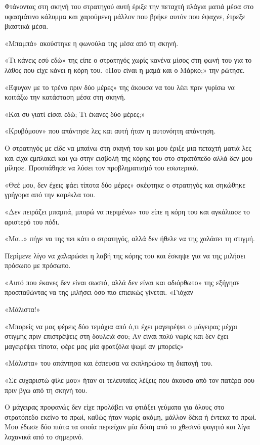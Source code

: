 \documentclass[12pt,twoside, openany]{book}
\begin{document}
Φτάνοντας στη σκηνή του στρατηγού αυτή έριξε την πεταχτή πλάγια ματιά μέσα στο υφασμάτινο κάλυμμα και χαρούμενη μάλλον που βρήκε αυτόν που έψαχνε, έτρεξε βιαστικά μέσα.

«Μπαμπά» ακούστηκε η φωνούλα της μέσα από τη σκηνή.

«Τι κάνεις εσύ εδώ» της είπε ο στρατηγός χωρίς κανένα μίσος στη φωνή του για το λάθος που είχε κάνει η κόρη του. «Που είναι η μαμά και ο Μάρκο;» την ρώτησε.

«Έφυγαν με το τρένο πριν δύο μέρες» της άκουσα να του λέει πριν γυρίσω να κοιτάξω την κατάσταση μέσα στη σκηνή.

«Και συ γιατί είσαι εδώ; Τι έκανες δύο μέρες;»

«Κρυβόμουν» που απάντησε λες και αυτή ήταν η αυτονόητη απάντηση.

Ο στρατηγός με είδε να μπαίνω στη σκηνή του και μου έριξε μια πεταχτή ματιά λες και είχα εμπλακεί και γω στην εισβολή της κόρης του στο στρατόπεδο αλλά δεν μου μίλησε. Προσπάθησε να λύσει τον προβληματισμό του εσωτερικά.

«Θεέ μου, δεν έχεις φάει τίποτα δύο μέρες» σκέφτηκε ο στρατηγός και σηκώθηκε γρήγορα από την καρέκλα του.

«Δεν πειράζει μπαμπά, μπορώ να περιμένω» του είπε η κόρη του και αγκάλιασε το αριστερό του πόδι.

«Μα…» πήγε να της πει κάτι ο στρατηγός, αλλά δεν ήθελε να της χαλάσει τη στιγμή.

Περίμενε λίγο να χαλαρώσει η λαβή της κόρης του και έσκηψε για να της μιλήσει πρόσωπο με πρόσωπο.

«Αυτό που έκανες δεν είναι σωστό, αλλά δεν είναι και αδιόρθωτο» της εξήγησε προσπαθώντας να της μιλήσει όσο πιο επιεικώς γίνεται. «Γιόχαν

«Μάλιστα!»

«Μπορείς να μας φέρεις δύο τεμάχια από ό,τι έχει μαγειρέψει ο μάγειρας μέχρι στιγμής πριν επιστρέψεις στη δουλειά σου; Αν είναι πολύ νωρίς και δεν έχει μαγειρέψει τίποτα, φέρε μας μία φρατζόλα ψωμί αν μπορείς»

«Μάλιστα» του απάντησα και έσπευσα να εκπληρώσω τη διαταγή του.

«Σε ευχαριστώ φίλε μου» ήταν οι τελευταίες λέξεις που άκουσα από τον πατέρα σου πριν βγω από τη σκηνή του.

Ο μάγειρας προφανώς δεν είχε προλάβει να φτιάξει γεύματα για όλους στο στρατόπεδο εκείνο το πρωί, καθώς ήταν νωρίς ακόμη, μάλλον δέκα ή έντεκα το πρωί. Μου έδωσε δύο πιάτα τα οποία περιείχαν μία δόση από το χθεσινό φαγητό και λίγα λαχανικά από το σημερινό.
\end{document}
